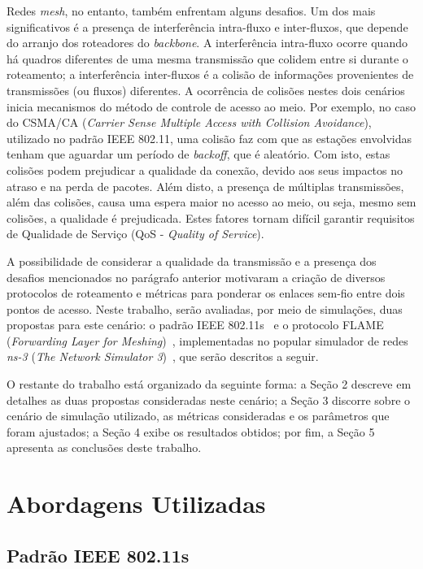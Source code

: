 \documentclass[letterpaper, 10 pt, conference]{ieeeconf}  %
\begin{document}
Redes \textit{mesh}, no entanto, também enfrentam alguns desafios. Um dos mais significativos é a presença de interferência intra-fluxo e inter-fluxos, que depende do arranjo dos roteadores do \textit{backbone}. A interferência intra-fluxo ocorre quando há quadros diferentes de uma mesma transmissão que colidem entre si durante o roteamento; a interferência inter-fluxos é a colisão de informações provenientes de transmissões (ou fluxos) diferentes. A ocorrência de colisões nestes dois cenários inicia mecanismos do método de controle de acesso ao meio. Por exemplo, no caso do CSMA/CA (\textit{Carrier Sense Multiple Access with Collision Avoidance}), utilizado no padrão IEEE 802.11, uma colisão faz com que as estações envolvidas tenham que aguardar um período de \textit{backoff}, que é aleatório. Com isto, estas colisões podem prejudicar a qualidade da conexão, devido aos seus impactos no atraso e na perda de pacotes. Além disto, a presença de múltiplas transmissões, além das colisões, causa uma espera maior no acesso ao meio, ou seja, mesmo sem colisões, a qualidade é prejudicada. Estes fatores tornam difícil garantir requisitos de Qualidade de Serviço (QoS - \textit{Quality of Service}).

A possibilidade de considerar a qualidade da transmissão e a presença dos desafios mencionados no parágrafo anterior motivaram a criação de diversos protocolos de roteamento e métricas para ponderar os enlaces sem-fio entre dois pontos de acesso. Neste trabalho, serão avaliadas, por meio de simulações, duas propostas para este cenário: o padrão IEEE 802.11s~\cite{carrano2011,hiertz2010,andreev2010} e o protocolo FLAME (\textit{Forwarding Layer for Meshing})~\cite{andreev2010,graaf2007}, implementadas no popular simulador de redes \textit{ns-3} (\textit{The Network Simulator 3})~\cite{ns3}, que serão descritos a seguir.

O restante do trabalho está organizado da seguinte forma: a Seção 2 descreve em detalhes as duas propostas consideradas neste cenário; a Seção 3 discorre sobre o cenário de simulação utilizado, as métricas consideradas e os parâmetros que foram ajustados; a Seção 4 exibe os resultados obtidos; por fim, a Seção 5 apresenta as conclusões deste trabalho.

\section{Abordagens Utilizadas}\label{sec:protocols}

\subsection{Padrão IEEE 802.11s}
\end{document}
